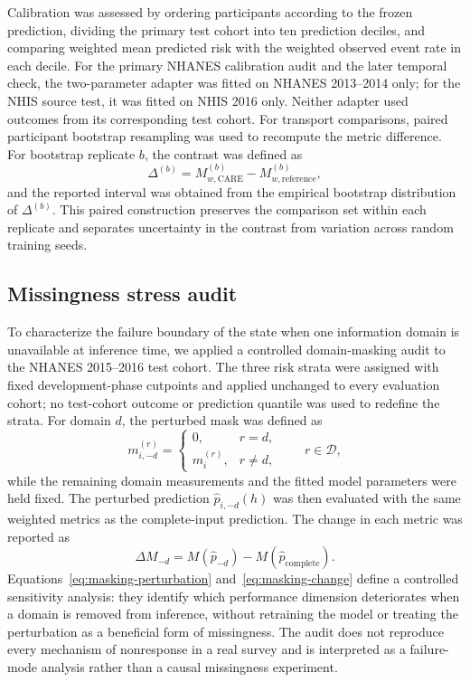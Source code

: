 \documentclass[12pt]{article}
\begin{document}
Calibration was assessed by ordering participants according to the frozen prediction, dividing the primary test cohort into ten prediction deciles, and comparing weighted mean predicted risk with the weighted observed event rate in each decile. For the primary NHANES calibration audit and the later temporal check, the two-parameter adapter was fitted on NHANES 2013--2014 only; for the NHIS source test, it was fitted on NHIS 2016 only. Neither adapter used outcomes from its corresponding test cohort. For transport comparisons, paired participant bootstrap resampling was used to recompute the metric difference. For bootstrap replicate $b$, the contrast was defined as
\begin{equation}
 \Delta^{(b)}=M^{(b)}_{w,\mathrm{CARE}}-M^{(b)}_{w,\mathrm{reference}},
 \label{eq:bootstrap-contrast}
\end{equation}
and the reported interval was obtained from the empirical bootstrap distribution of $\Delta^{(b)}$. This paired construction preserves the comparison set within each replicate and separates uncertainty in the contrast from variation across random training seeds.

\subsection{Missingness stress audit}
To characterize the failure boundary of the state when one information domain is unavailable at inference time, we applied a controlled domain-masking audit to the NHANES 2015--2016 test cohort. The three risk strata were assigned with fixed development-phase cutpoints and applied unchanged to every evaluation cohort; no test-cohort outcome or prediction quantile was used to redefine the strata. For domain $d$, the perturbed mask was defined as
\begin{equation}
 m_{i,-d}^{(r)}=\begin{cases}
 0,&r=d,\\
 m_i^{(r)},&r\neq d,
 \end{cases}
 \qquad r\in\mathcal{D},
 \label{eq:masking-perturbation}
\end{equation}
while the remaining domain measurements and the fitted model parameters were held fixed. The perturbed prediction $\hat p_{i,-d}(h)$ was then evaluated with the same weighted metrics as the complete-input prediction. The change in each metric was reported as
\begin{equation}
 \Delta M_{-d}=M\left(\hat p_{-d}\right)-M\left(\hat p_{\mathrm{complete}}\right).
 \label{eq:masking-change}
\end{equation}
Equations~\ref{eq:masking-perturbation} and~\ref{eq:masking-change} define a controlled sensitivity analysis: they identify which performance dimension deteriorates when a domain is removed from inference, without retraining the model or treating the perturbation as a beneficial form of missingness. The audit does not reproduce every mechanism of nonresponse in a real survey and is interpreted as a failure-mode analysis rather than a causal missingness experiment.
\end{document}
